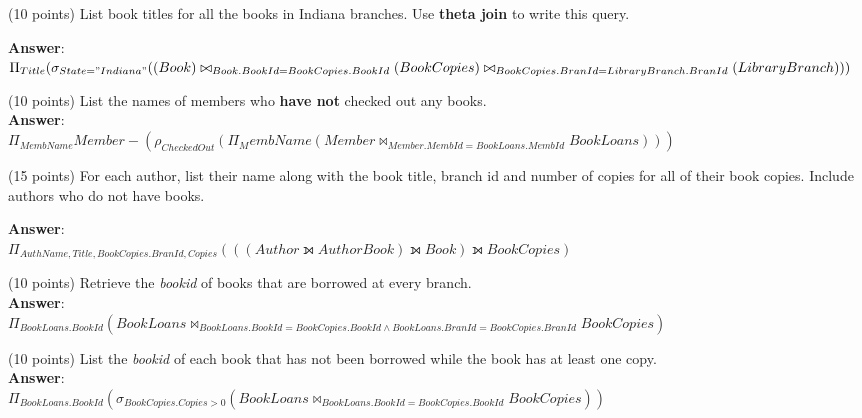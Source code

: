 \begin{questions}
\begin{choices}
	\choice(10 points) List book titles for all the books in Indiana branches. Use \textbf{theta join} to write this query. 
	
	\textbf{Answer}:\\
	$\Pi_{Title} (\sigma_{State = "Indiana"} ((Book)\bowtie_{Book.BookId = BookCopies.BookId}(BookCopies)\newline \bowtie_{BookCopies.BranId = LibraryBranch.BranId} (LibraryBranch)))$
	\vspace{50 mm}
	
	\choice(10 points) List the names of members who \textbf{have not} checked out any books. \\
	\textbf{Answer}:\\
	$\Pi_{MembName} Member - (\rho_{CheckedOut} (\Pi_MembName(Member \bowtie_{Member.MembId = BookLoans.MembId} BookLoans)))$
	\vspace{50 mm}
    
	\choice(15 points) For each author, list their name along with the book title, branch id and  number of copies for all of their book copies. Include authors who do not have books.  
	
    \textbf{Answer}:\\
	$\Pi_{AuthName, Title, BookCopies.BranId, Copies} (((Author \leftouterjoin AuthorBook) \leftouterjoin Book ) \leftouterjoin BookCopies )$
	\vspace{50 mm}
	
	
	\choice(10 points) Retrieve the \textit{bookid} of books that are borrowed at every branch. \\
    \textbf{Answer}:\\
	$\Pi_{BookLoans.BookId} (BookLoans \bowtie_{BookLoans.BookId = BookCopies.BookId \wedge BookLoans.BranId = BookCopies.BranId} BookCopies)$
	\vspace{50 mm}
    
   
	
	\choice(10 points) List the \textit{bookid} of each book that has not been borrowed while the book has at least one copy. \\
    \textbf{Answer}:\\
	$\Pi_{BookLoans.BookId} (\sigma_{BookCopies.Copies > 0} (BookLoans \bowtie_{BookLoans.BookId = BookCopies.BookId} BookCopies))$
	\vspace{50 mm}
    

\end{choices}
\end{questions}
